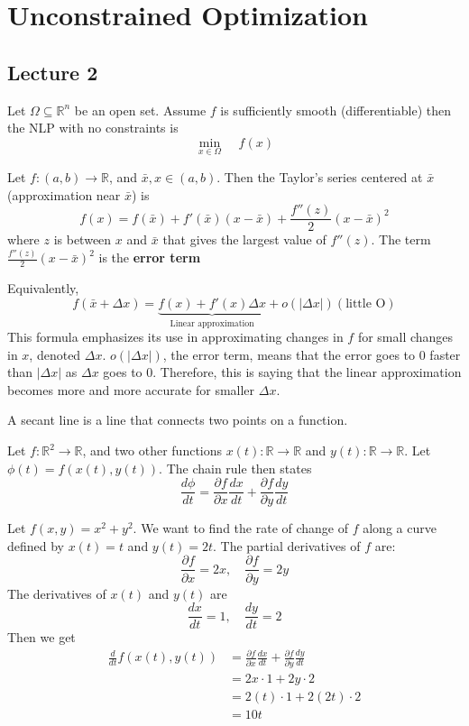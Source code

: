 \section{Unconstrained Optimization}
\subsection{Lecture 2}
\begin{problem}
    Let $\Omega \subseteq \mathbb R^n$ be an open set. Assume $f$ is sufficiently smooth (differentiable) then the NLP with no constraints is $$\min_{x \in \Omega} \;\;\;\; f(x)$$
\end{problem}
\begin{theorem}
    Let $f: (a, b) \rightarrow \mathbb R$, and $\bar{x}, x \in (a,b)$. Then the Taylor's series centered at $\bar x$ (approximation near $\bar x$) is $$f(x) = f(\bar x) + f'(\bar x)(x - \bar x) + \frac{f''(z)}{2}(x - \bar x)^2$$
    where $z$ is between $x$ and $\bar x$ that gives the largest value of $f''(z)$. The term $\frac{f''(z)}{2}(x - \bar x)^2$ is the \textbf{error term}

    Equivalently,
    $$f(\bar x + \Delta x) = \underbrace{f(x) + f'(x) \Delta x}_{\text{Linear approximation}} + o(|\Delta x|)(\text{little O})$$
    This formula emphasizes its use in approximating changes in $f$ for small changes in $x$, denoted $\Delta x$. $o(|\Delta x|)$, the error term, means that the error goes to 0 faster than $|\Delta x|$ as $\Delta x$ goes to 0. Therefore, this is saying that the linear approximation becomes more and more accurate for smaller $\Delta x$.
\end{theorem}
\begin{definition}
    A secant line is a line that connects two points on a function.
\end{definition}
\begin{theorem}
    Let $f: \mathbb R^2 \rightarrow \mathbb R$, and two other functions $x(t): \mathbb R \rightarrow \mathbb R$ and $y(t): \mathbb R \rightarrow \mathbb R$. Let $\phi(t) = f(x(t), y(t))$. The chain rule then states
    $$\frac{d\phi}{dt} = \frac{\partial f}{\partial x} \frac{dx}{dt} + \frac{\partial f}{\partial y} \frac{dy}{dt}$$
\end{theorem}
\begin{problem}
    Let $f(x,y) = x^2 + y^2$. We want to find the rate of change of $f$ along a curve defined by $x(t) = t$ and $y(t) = 2t$. The partial derivatives of $f$ are: $$\frac{\partial f}{\partial x} = 2x, \quad \frac{\partial f}{\partial y} = 2y$$ The derivatives of $x(t)$ and $y(t)$ are $$\frac{dx}{dt} = 1, \quad \frac{dy}{dt} = 2$$ Then we get
    \begin{align*}
        \frac{d}{dt} f(x(t), y(t)) &= \frac{\partial f}{\partial x} \frac{dx}{dt} + \frac{\partial f}{\partial y} \frac{dy}{dt} \\
        &= 2x \cdot 1 + 2y \cdot 2 \\
        &= 2(t) \cdot 1 + 2(2t) \cdot 2 \\
        &= 10t
    \end{align*}
\end{problem}
